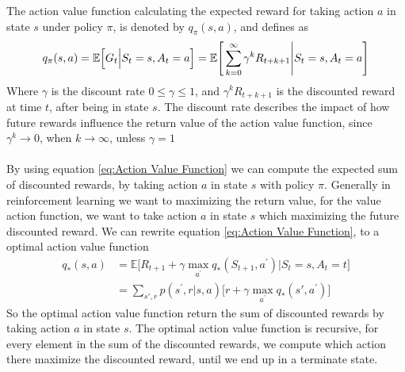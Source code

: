\documentclass[11pt]{article}
\begin{document}
The action value function calculating the expected reward for taking action $a$ in state $s$ under policy $\pi$, is denoted by $q_{\pi}(s, a)$, and defines as
\\
\begin{equation} \label{eq:Action Value Function}
    q_{\pi}(s, a) = \mathbb{E}\Big[G_{t} \Big| S_{t} = s, A_{t} = a\Big] \\
    = \mathbb{E}\Bigg[\sum_{k = 0}^{\infty}\gamma^{k}R_{t + k + 1} \Bigg| S_{t} = s, A_{t} = a \Bigg]
\end{equation}
Where $\gamma$ is the discount rate $0 \leq \gamma \leq 1$, and $\gamma^{k}R_{t + k + 1}$ is the discounted reward at time $t$, after being in state $s$. The discount rate describes the impact of how future rewards influence the return value of the action value function, since $\gamma^{k} \rightarrow 0$, when $k \rightarrow \infty$, unless $\gamma = 1$
\\ \\
By using equation \ref{eq:Action Value Function} we can compute the expected sum of discounted rewards, by taking action $a$ in state $s$ with policy $\pi$. Generally in reinforcement learning we want to maximizing the return value, for the value action function, we want to take action $a$ in state $s$ which maximizing the future discounted reward. We can rewrite equation \ref{eq:Action Value Function}, to a optimal action value function
\begin{equation}
\begin{split}
    q_{*}(s,a) &= \mathbb{E}\Bigg[R_{t + 1} + \gamma  \max\limits_{a^{'}} q_{*}(S_{t + 1}, a^{'}) \Bigg| S_{t} = s, A_{t} = t \Bigg] \\
    &= \sum_{s{'}, r} p(s^{'}, r \Big| s, a) \Big[r + \gamma \max\limits_{a^{'}}q_{*}(s{'}, a^{'})\Big]
\end{split}
\end{equation}
So the optimal action value function return the sum of discounted rewards by taking action $a$ in state $s$. The optimal action value function is recursive, for every element in the sum of the discounted rewards, we compute which action there maximize the discounted reward, until we end up in a terminate state.
\end{document}
